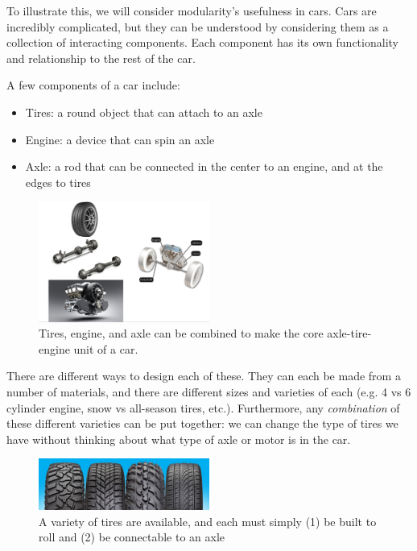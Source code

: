 To illustrate this, we will consider modularity's usefulness in cars. Cars are incredibly complicated, but they can be understood by considering them as a collection of interacting components. Each component has its own functionality and relationship to the rest of the car.  

A few components of a car include:
\begin{itemize}
\item Tires: a round object that can attach to an axle
\item Engine: a device that can spin an axle
\item Axle: a rod that can be connected in the center to an engine, and at the edges to tires
\end{itemize} 

\begin{figure}
	\centering
	\includegraphics[width=0.5\textwidth]{images/car_example}
	\caption{Tires, engine, and axle can be combined to make the core axle-tire-engine unit of a car.}
\end{figure}

There are different ways to design each of these. They can each be made from a number of materials, and there are different sizes and varieties of each (e.g. 4 vs 6 cylinder engine, snow vs all-season tires, etc.). Furthermore, any \textit{combination} of these different varieties can be put together: we can change the type of tires we have without thinking about what type of axle or motor is in the car. 

\begin{figure}
	\centering
	\includegraphics[width=0.5\textwidth]{images/tires.jpg}
	\caption{A variety of tires are available, and each must simply (1) be built to roll and (2) be connectable to an axle}
\end{figure}

